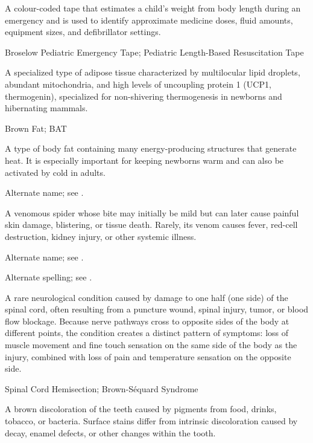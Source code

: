  A colour-coded tape that estimates a child's weight from body length during an emergency and is used to identify approximate medicine doses, fluid amounts, equipment sizes, and defibrillator settings.

\synonyms
Broselow Pediatric Emergency Tape; Pediatric Length-Based Resuscitation Tape

 A specialized type of adipose tissue characterized by multilocular lipid droplets, abundant mitochondria, and high levels of uncoupling protein 1 (UCP1, thermogenin), specialized for non-shivering thermogenesis in newborns and hibernating mammals.

\synonyms
Brown Fat; BAT

 A type of body fat containing many energy-producing structures that generate heat. It is especially important for keeping newborns warm and can also be activated by cold in adults.

 Alternate name; see .

 A venomous spider whose bite may initially be mild but can later cause painful skin damage, blistering, or tissue death. Rarely, its venom causes fever, red-cell destruction, kidney injury, or other systemic illness.

 Alternate name; see .

 Alternate spelling; see .

 A rare neurological condition caused by damage to one half (one side) of the spinal cord, often resulting from a puncture wound, spinal injury, tumor, or blood flow blockage. Because nerve pathways cross to opposite sides of the body at different points, the condition creates a distinct pattern of symptoms: loss of muscle movement and fine touch sensation on the same side of the body as the injury, combined with loss of pain and temperature sensation on the opposite side.

\synonyms
Spinal Cord Hemisection; Brown-Séquard Syndrome

 A brown discoloration of the teeth caused by pigments
from food, drinks, tobacco, or bacteria. Surface stains differ from intrinsic
discoloration caused by decay, enamel defects, or other changes within the tooth.

